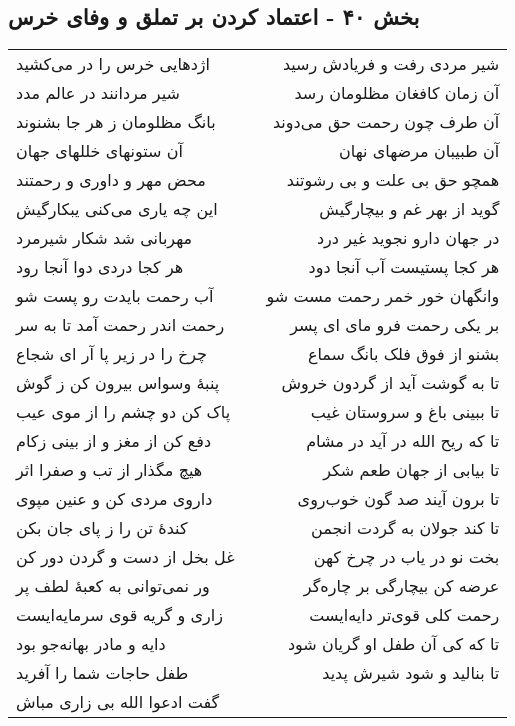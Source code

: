 \begin{center}
\section*{بخش ۴۰ - اعتماد کردن بر تملق و وفای خرس}
\label{sec:sh040}
\begin{longtable}{l p{0.5cm} r}
اژدهایی خرس را در می‌کشید
&&
شیر مردی رفت و فریادش رسید
\\
شیر مردانند در عالم مدد
&&
آن زمان کافغان مظلومان رسد
\\
بانگ مظلومان ز هر جا بشنوند
&&
آن طرف چون رحمت حق می‌دوند
\\
آن ستونهای خللهای جهان
&&
آن طبیبان مرضهای نهان
\\
محض مهر و داوری و رحمتند
&&
همچو حق بی علت و بی رشوتند
\\
این چه یاری می‌کنی یبکارگیش
&&
گوید از بهر غم و بیچارگیش
\\
مهربانی شد شکار شیرمرد
&&
در جهان دارو نجوید غیر درد
\\
هر کجا دردی دوا آنجا رود
&&
هر کجا پستیست آب آنجا دود
\\
آب رحمت بایدت رو پست شو
&&
وانگهان خور خمر رحمت مست شو
\\
رحمت اندر رحمت آمد تا به سر
&&
بر یکی رحمت فرو مای ای پسر
\\
چرخ را در زیر پا آر ای شجاع
&&
بشنو از فوق فلک بانگ سماع
\\
پنبهٔ وسواس بیرون کن ز گوش
&&
تا به گوشت آید از گردون خروش
\\
پاک کن دو چشم را از موی عیب
&&
تا ببینی باغ و سروستان غیب
\\
دفع کن از مغز و از بینی زکام
&&
تا که ریح الله در آید در مشام
\\
هیچ مگذار از تب و صفرا اثر
&&
تا بیابی از جهان طعم شکر
\\
داروی مردی کن و عنین مپوی
&&
تا برون آیند صد گون خوب‌روی
\\
کندهٔ تن را ز پای جان بکن
&&
تا کند جولان به گردت انجمن
\\
غل بخل از دست و گردن دور کن
&&
بخت نو در یاب در چرخ کهن
\\
ور نمی‌توانی به کعبهٔ لطف پر
&&
عرضه کن بیچارگی بر چاره‌گر
\\
زاری و گریه قوی سرمایه‌ایست
&&
رحمت کلی قوی‌تر دایه‌ایست
\\
دایه و مادر بهانه‌جو بود
&&
تا که کی آن طفل او گریان شود
\\
طفل حاجات شما را آفرید
&&
تا بنالید و شود شیرش پدید
\\
گفت ادعوا الله بی زاری مباش

\end{longtable}
\end{center}
